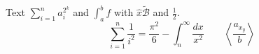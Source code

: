 \documentclass{article}
\begin{document}
Text $\sum_{i=1}^{n} a_i^{2^k}$ and $\int_a^b f$ with $\hat{x}\tilde{\mathcal{B}}$ and $\frac{1}{2}$.
\[ \sum_{i=1}^{n} \frac{1}{i^2} = \frac{\pi^2}{6} - \int_{n}^{\infty} \frac{dx}{x^2} \qquad \left\langle \frac{a_{x_{y}}}{b} \right\rangle \]
\end{document}

